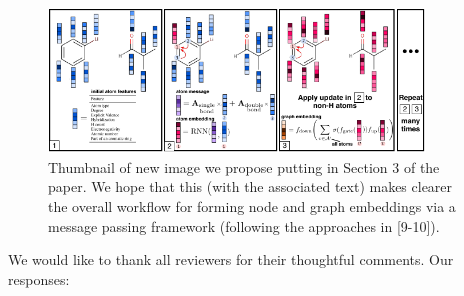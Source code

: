 \documentclass{article}
\begin{document}


\begin{figure}
\centering
\vspace{-12pt}
  \includegraphics[width=10cm]{graph_nn.pdf}
  \vspace{-18pt}
 \caption{Thumbnail of new image we propose  putting in Section 3 of the paper. We hope that this (with the associated text) makes clearer the overall workflow for forming node and graph embeddings via a message passing framework (following the approaches in [9-10]).}
 \label{fig:new-diagram}
 \vspace{-5ex}
\end{figure}

We would like to thank all reviewers for their thoughtful comments. 
Our responses:
\end{document}
